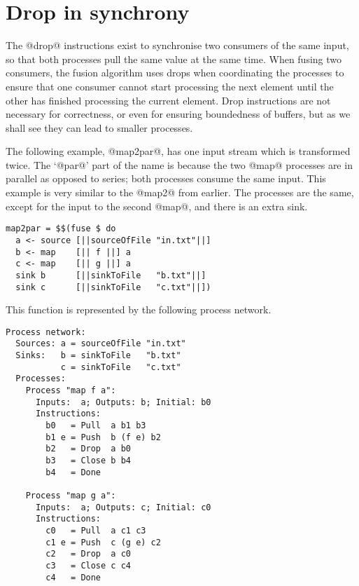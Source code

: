 \section{Drop in synchrony}

The @drop@ instructions exist to synchronise two consumers of the same input, so that both processes pull the same value at the same time.
When fusing two consumers, the fusion algorithm uses drops when coordinating the processes to ensure that one consumer cannot start processing the next element until the other has finished processing the current element.
Drop instructions are not necessary for correctness, or even for ensuring boundedness of buffers, but as we shall see they can lead to smaller processes.

The following example, @map2par@, has one input stream which is transformed twice.
The `@par@' part of the name is because the two @map@ processes are in parallel as opposed to series; both processes consume the same input.
This example is very similar to the @map2@ from earlier.
The processes are the same, except for the input to the second @map@, and there is an extra sink.

\begin{lstlisting}
map2par = $$(fuse $ do
  a <- source [||sourceOfFile "in.txt"||]
  b <- map    [|| f ||] a
  c <- map    [|| g ||] a
  sink b      [||sinkToFile   "b.txt"||]
  sink c      [||sinkToFile   "c.txt"||])
\end{lstlisting}

This function is represented by the following process network.

\begin{lstlisting}[linebackgroundcolor={
  \hilineFst{9}
  \hilineFst{10}
  \hilineFst{11}
  \hilineFst{12}
  \hilineFst{13}
  \hilineSnd{18}
  \hilineSnd{19}
  \hilineSnd{20}
  \hilineSnd{21}
  \hilineSnd{22}
  }]
Process network:
  Sources: a = sourceOfFile "in.txt"
  Sinks:   b = sinkToFile   "b.txt"
           c = sinkToFile   "c.txt"
  Processes:
    Process "map f a":
      Inputs:  a; Outputs: b; Initial: b0
      Instructions:
        b0   = Pull  a b1 b3
        b1 e = Push  b (f e) b2
        b2   = Drop  a b0
        b3   = Close b b4        
        b4   = Done

    Process "map g a":
      Inputs:  a; Outputs: c; Initial: c0
      Instructions:
        c0   = Pull  a c1 c3      
        c1 e = Push  c (g e) c2     
        c2   = Drop  a c0
        c3   = Close c c4         
        c4   = Done
\end{lstlisting}

